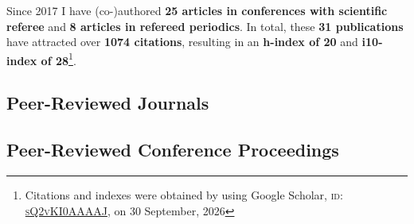 \documentclass[10pt, a4paper]{article}
\newcommand{\wos}{\badge[wos]{WoS}}
\newcommand{\scopus}{\badge[scopus]{Scopus}}
\newcommand{\crossref}{\badge[crossref]{CrossRef}}
\newcommand{\dblp}{\badge[dblp]{DBLP}}
\let\oldhref\href
\renewcommand{\href}[2]{\oldhref{#1}{{\small #2}}}
\begin{document}
Since 2017 I have (co-)authored \textbf{25 articles in conferences with scientific referee} and \textbf{8 articles in refereed periodics}. In total, these \textbf{31 publications} have attracted over \textbf{1074 citations}, resulting in an \textbf{h-index of 20} and \textbf{i10-index of 28}\footnote{Citations and indexes were obtained by using Google Scholar, \textsc{id: \href{https://scholar.google.com/citations?user=sQ2vKI0AAAAJ}{sQ2vKI0AAAAJ}}, on 30 September, 2026}. %

\subsection*{Peer-Reviewed Journals}

\begin{etaremune}
	\renewcommand\labelenumi{\footnotesize\theenumi .}
    \item {} %
	\item {} %
	\item {} %
	\item {} %
	\item {} %
	\item {} %
	\item {} %
	\item {} %
\end{etaremune}

\subsection*{Peer-Reviewed Conference Proceedings}
\end{document}
